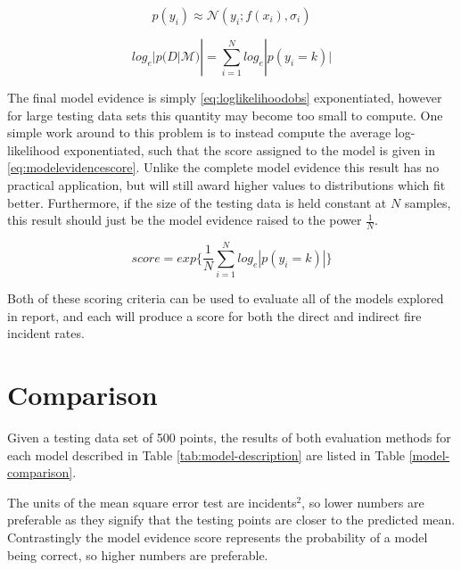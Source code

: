 \documentclass[a4paper,11pt]{report}
\begin{document}
\singlespacing
\begin{equation} \label{eq:glikelihoodobs}
p(y_i) \approx \mathcal{N}(y_i;f(x_i),\sigma_i)
\end{equation}

\begin{equation} \label{eq:loglikelihoodobs}
log_e |p(D|\mathcal{M})| =  \displaystyle \sum_{i=1}^{N} log_e |p(y_i = k)|
\end{equation}
\doublespacing

The final model evidence is simply \ref{eq:loglikelihoodobs} exponentiated, however for large testing data sets this quantity may become too small to compute. One simple work around to this problem is to instead compute the average log-likelihood exponentiated, such that the score assigned to the model is given in \ref{eq:modelevidencescore}. Unlike the complete model evidence this result has no practical application, but will still award higher values to distributions which fit better. Furthermore, if the size of the testing data is held constant at \(N\) samples, this result should just be the model evidence raised to the power \(\frac{1}{N}\). 

\begin{equation} \label{eq:modelevidencescore}
score = exp \{ \frac{1}{N} \displaystyle \sum_{i=1}^{N}  log_e |p(y_i = k)|  \}
\end{equation}

Both of these scoring criteria can be used to evaluate all of the models explored in report, and each will produce a score for both the direct and indirect fire incident rates.

\section{Comparison}

Given a testing data set of 500 points, the results of both evaluation methods for each model described in Table \ref{tab:model-description} are listed in Table \ref{model-comparison}. \par

The units of the mean square error test are incidents\(^2\), so lower numbers are preferable as they signify that the testing points are closer to the predicted mean. Contrastingly the model evidence score represents the probability of a model being correct, so higher numbers are preferable.
\end{document}
